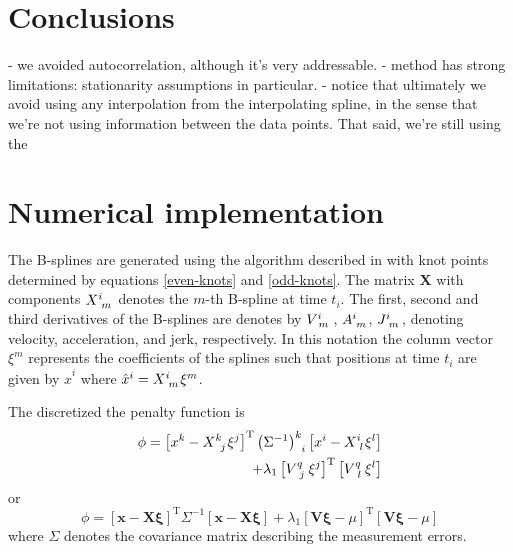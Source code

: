 \documentclass[10pt,journal]{IEEEtran}
\begin{document}
\section{Conclusions}

- we avoided autocorrelation, although it's very addressable.
- method has strong limitations: stationarity assumptions in particular.
- notice that ultimately we avoid using any interpolation from the interpolating spline, in the sense that we're not using information between the data points. That said, we're still using the 

%
\appendices
%

\section{Numerical implementation}
\label{sec:numerical_implementation}

The B-splines are generated using the algorithm described in \cite{deboor1978-book} with knot points determined by equations \ref{even-knots} and \ref{odd-knots}. The matrix $\mathbf{X}$ with components $X\indices{^i_m}$ denotes the $m$-th B-spline at time $t_i$. The first, second and third derivatives of the B-splines are denotes by $V\indices{^i_m}$, $A\indices{^i_m}$, $J\indices{^i_m}$, denoting velocity, acceleration, and jerk, respectively. In this notation the column vector $\xi^m$ represents the coefficients of the splines such that positions at time $t_i$ are given by $\hat{x}^i$ where $\hat{x}^i =  X\indices{^i_m} \xi^m$.

The discretized the penalty function is
\begin{equation}
\begin{split}
\phi = \left[ x^k - X\indices{^k_j} \xi^j \right]^{\textrm{T}} \left(\Sigma^{-1}\right)\indices{^k_i} \left[ x^i - X\indices{^i_l} \xi^l \right] \\
+ \lambda_1 \left[V\indices{^q_j} \xi^j \right]^{\textrm{T}} \left[ V\indices{^q_l} \xi^l \right]
\end{split}
\end{equation}
or
\begin{equation}
\phi = \left[ \mathbf{x} - \mathbf{X} \mathbf{\xi} \right]^{\textrm{T}} \Sigma^{-1} \left[ \mathbf{x} - \mathbf{X} \mathbf{\xi}\right]
+ \lambda_1 \left[\mathbf{V}\mathbf{\xi} - \mu \right]^{\textrm{T}} \left[ \mathbf{V}\mathbf{\xi} - \mu \right]
\end{equation}
where $\Sigma$ denotes the covariance matrix describing the measurement errors.
\end{document}
